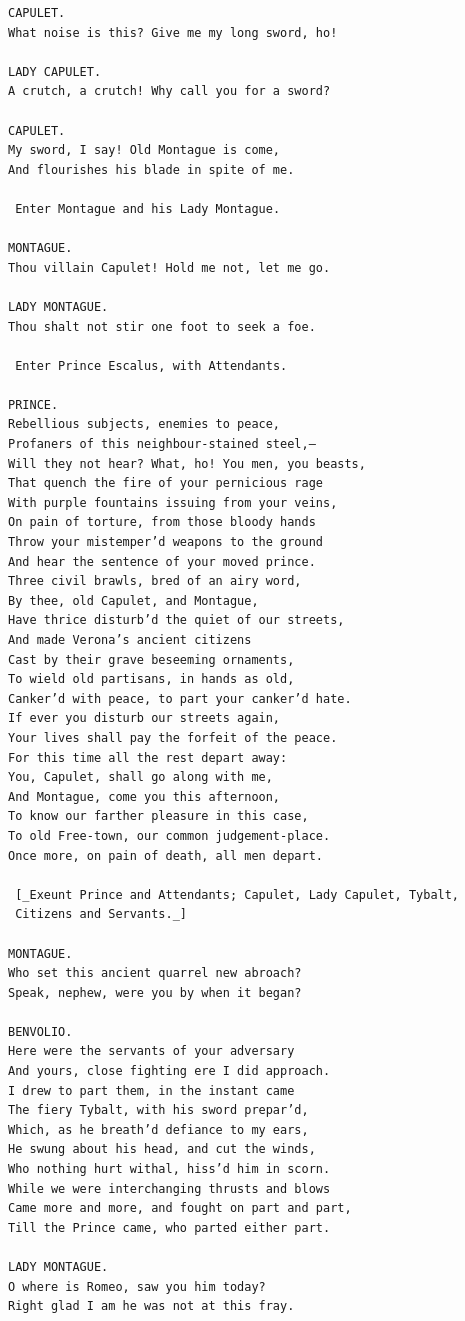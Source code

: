 \documentclass{article}
\begin{document}
\begin{verbatim}
CAPULET.
What noise is this? Give me my long sword, ho!

LADY CAPULET.
A crutch, a crutch! Why call you for a sword?

CAPULET.
My sword, I say! Old Montague is come,
And flourishes his blade in spite of me.

 Enter Montague and his Lady Montague.

MONTAGUE.
Thou villain Capulet! Hold me not, let me go.

LADY MONTAGUE.
Thou shalt not stir one foot to seek a foe.

 Enter Prince Escalus, with Attendants.

PRINCE.
Rebellious subjects, enemies to peace,
Profaners of this neighbour-stained steel,—
Will they not hear? What, ho! You men, you beasts,
That quench the fire of your pernicious rage
With purple fountains issuing from your veins,
On pain of torture, from those bloody hands
Throw your mistemper’d weapons to the ground
And hear the sentence of your moved prince.
Three civil brawls, bred of an airy word,
By thee, old Capulet, and Montague,
Have thrice disturb’d the quiet of our streets,
And made Verona’s ancient citizens
Cast by their grave beseeming ornaments,
To wield old partisans, in hands as old,
Canker’d with peace, to part your canker’d hate.
If ever you disturb our streets again,
Your lives shall pay the forfeit of the peace.
For this time all the rest depart away:
You, Capulet, shall go along with me,
And Montague, come you this afternoon,
To know our farther pleasure in this case,
To old Free-town, our common judgement-place.
Once more, on pain of death, all men depart.

 [_Exeunt Prince and Attendants; Capulet, Lady Capulet, Tybalt,
 Citizens and Servants._]

MONTAGUE.
Who set this ancient quarrel new abroach?
Speak, nephew, were you by when it began?

BENVOLIO.
Here were the servants of your adversary
And yours, close fighting ere I did approach.
I drew to part them, in the instant came
The fiery Tybalt, with his sword prepar’d,
Which, as he breath’d defiance to my ears,
He swung about his head, and cut the winds,
Who nothing hurt withal, hiss’d him in scorn.
While we were interchanging thrusts and blows
Came more and more, and fought on part and part,
Till the Prince came, who parted either part.

LADY MONTAGUE.
O where is Romeo, saw you him today?
Right glad I am he was not at this fray.


\end{verbatim}
\end{document}
